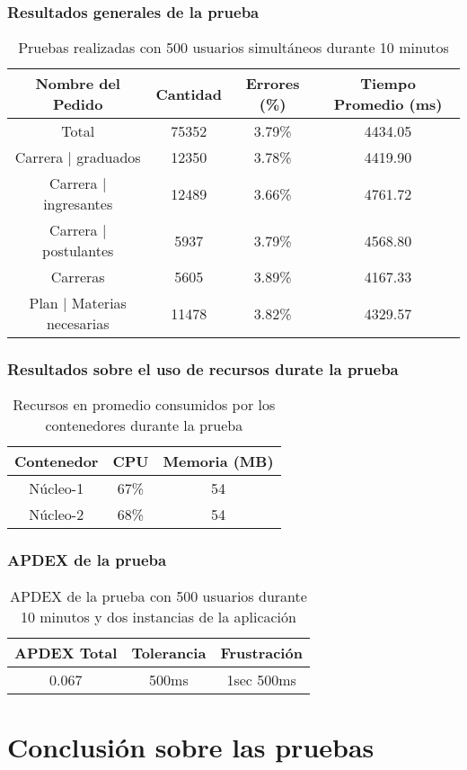 \subsubsection{Resultados generales de la prueba}
\begin{table}[!htbp]
    \centering
    \makegapedcells
    \begin{tabular}{|c|c|c|c|}
    \hline
    Nombre del Pedido & Cantidad & Errores (\%) & Tiempo Promedio (ms) \\ \hline
    Total & 75352 & 3.79\% & 4434.05\\ \hline
    Carrera | graduados & 12350 & 3.78\% & 4419.90\\ \hline
    Carrera | ingresantes & 12489 & 3.66\% & 4761.72\\ \hline
    Carrera | postulantes & 5937 & 3.79\% & 4568.80\\ \hline
    Carreras & 5605 & 3.89\% & 4167.33\\ \hline
    Plan | Materias necesarias & 11478 & 3.82\% & 4329.57\\
    \end{tabular}
    \caption{Pruebas realizadas con 500 usuarios simultáneos durante 10 minutos}
    \label{tab:tabla_planes}
\end{table}

\subsubsection{Resultados sobre el uso de recursos durate la prueba}
\begin{table}[!htbp]
    \centering
    \makegapedcells
    \begin{tabular}{|c|c|c|}
    \hline
    Contenedor & CPU & Memoria (MB)\\ \hline
    Núcleo-1 & 67\% & 54 \\ \hline
    Núcleo-2 & 68\% & 54 \\ \hline
    \end{tabular}
    \caption{Recursos en promedio consumidos por los contenedores durante la prueba}
    \label{tab:tabla_planes}
\end{table}
\subsubsection{APDEX de la prueba}
\begin{table}[!htbp]
    \centering
    \makegapedcells
    \begin{tabular}{|c|c|c|}
    \hline
    APDEX Total & Tolerancia & Frustración\\ \hline
    0.067 & 500ms & 1sec 500ms \\ \hline
    \end{tabular}
    \caption{APDEX de la prueba con 500 usuarios durante 10 minutos y dos instancias de la aplicación}
    \label{tab:tabla_planes}
\end{table}
\break
\section{Conclusión sobre las pruebas}




